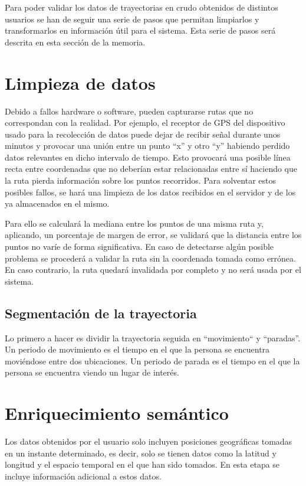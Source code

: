 
Para poder validar los datos de trayectorias en crudo obtenidos de distintos usuarios se han de seguir una serie de pasos que permitan limpiarlos y transformarlos en información útil para el sistema. Esta serie de pasos será descrita en esta sección de la memoria.

\section{Limpieza de datos}

Debido a fallos hardware o software, pueden capturarse rutas que no correspondan con la realidad. Por ejemplo, el receptor de GPS del dispositivo usado para la recolección de datos puede dejar de recibir señal durante unos minutos y provocar una unión entre un punto ``x'' y otro ``y'' habiendo perdido datos relevantes en dicho intervalo de tiempo. Esto provocará una posible línea recta entre coordenadas que no deberían estar relacionadas entre sí haciendo que la ruta pierda información sobre los puntos recorridos. Para solventar estos posibles fallos, se hará una limpieza de los datos recibidos  en el servidor y de los ya almacenados en el mismo.

Para ello se calculará la mediana entre los puntos de una misma ruta y, aplicando, un porcentaje de margen de error, se validará que la distancia entre los puntos no varíe de forma significativa. En caso de detectarse algún posible problema se procederá a validar la ruta sin la coordenada tomada como errónea. En caso contrario, la ruta quedará invalidada por completo y no será usada por el sistema. 

\subsection{Segmentación de la trayectoria}

Lo primero a hacer es dividir la trayectoria seguida en ``movimiento`` y ``paradas''. Un periodo de movimiento es el tiempo en el que la persona se encuentra moviéndose entre dos ubicaciones. Un periodo de parada es el tiempo en el que la persona se encuentra viendo un lugar de interés.

\section{Enriquecimiento semántico}

Los datos obtenidos por el usuario solo incluyen posiciones geográficas tomadas en un instante determinado, es decir, solo se tienen datos como la latitud y longitud y el espacio temporal en el que han sido tomados. En esta etapa se incluye información adicional a estos datos.

